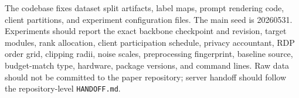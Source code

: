 The codebase fixes dataset split artifacts, label maps, prompt rendering code, client partitions, and experiment configuration files. The main seed is 20260531. Experiments should report the exact backbone checkpoint and revision, target modules, rank allocation, client participation schedule, privacy accountant, RDP order grid, clipping radii, noise scales, preprocessing fingerprint, baseline source, budget-match type, hardware, package versions, and command lines. Raw data should not be committed to the paper repository; server handoff should follow the repository-level \texttt{HANDOFF.md}.

